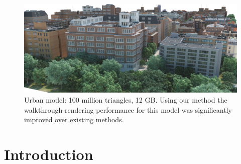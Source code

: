\begin{figure}[t]
  \centering
  \includegraphics[width=\columnwidth]{densecity.jpg}
  \caption{Urban model: 100 million triangles, 12 GB. Using our method the walkthrough rendering performance for this model was significantly improved over existing methods. }
  \label{fig:model3}
\end{figure}

\section{Introduction}


